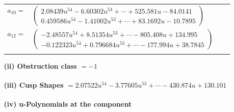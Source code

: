 \documentclass[1p]{elsarticle_modified}
\theoremstyle{definition}
\begin{document}
\begin{tabular}{m{7pt} m{180pt} m{7pt} m{180pt} }
\flushright $a_{10}=$&$\begin{pmatrix}2.08439 u^{54}-6.60302 u^{53}+\cdots+525.581 u-84.0141\\0.459586 u^{54}-1.41002 u^{53}+\cdots+83.1692 u-10.7895\end{pmatrix}$ \\
\flushright $a_{12}=$&$\begin{pmatrix}-2.48557 u^{54}+8.51354 u^{53}+\cdots-805.408 u+134.995\\-0.122323 u^{54}+0.796684 u^{53}+\cdots-177.994 u+38.7845\end{pmatrix}$\\&\end{tabular}
\flushleft \textbf{(ii) Obstruction class $= -1$}\\~\\
\flushleft \textbf{(iii) Cusp Shapes $= 2.07522 u^{54}-3.77605 u^{53}+\cdots-430.874 u+130.101$}\\~\\
\newpage\renewcommand{\arraystretch}{1}
\flushleft \textbf{(iv) u-Polynomials at the component}\newline \\
\end{document}
